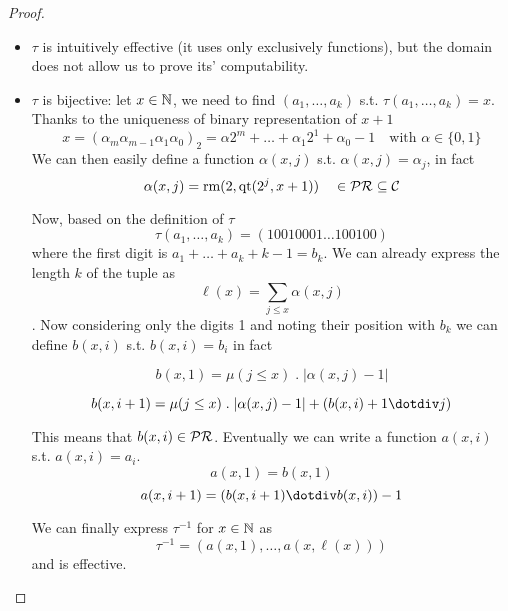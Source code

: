 \begin{lemma}
\begin{proof}
\begin{enumerate}[label=(\arabic*)]
{        \begin{itemize}
        \item $\tau$ is intuitively effective (it uses only
          exclusively functions), but the domain does not allow us to
          prove its' computability.
        \item $\tau$ is bijective: let $x \in \mathbb{N}$, we need to find
          $(a_1, \dots, a_k)$ s.t. $\tau(a_1,\dots,a_k) = x$. Thanks
          to the uniqueness of binary representation of $x+1$
          \[x = (\alpha_m \alpha_{m-1} \alpha_1 \alpha_0)_2 = \alpha
            2^m + \dots + \alpha_1 2^1 + \alpha_0 - 1 \quad \text{with
            } \alpha \in \{0,1\} \] We can then easily define a
          function $\alpha(x,j)$ s.t. $\alpha(x,j) = \alpha_j$, in
          fact
          \[\alpha(x, j) = \text{rm}(2, \text{qt}(2^j, x+1)) \quad \in
            \mathcal{PR} \subseteq \mathcal{C}\]

          Now, based on the definition of $\tau$
          \[\tau(a_1, \dots, a_k) = (1 0 0 1 0 0 0 1 \dots 1 0 0 1 0
            0)\] where the first digit is $a_1+\dots+a_k+k-1 =
          b_k$. We can already express the length $k$ of the tuple
          as \[\ell (x) = \sum_{j \leq x}\alpha(x,j)\]. Now considering
          only the digits 1 and noting their position with $b_k$ we
          can define $b(x,i)$ s.t. $b(x,i) = b_i$ in fact

          \[b(x,1) = \mu(j \leq x) \; . \; |\alpha(x,j) - 1|\]

          \[b(x,i+1) = \mu(j \leq x) \; . \; |\alpha(x,j)-1| +
            (b(x,i)+1 \dotdiv j)\]

          This means that $b(x,i)\in \mathcal{PR}$.  Eventually we can write a
          function $a(x,i)$ s.t. $a(x,i) = a_i$.
          \[a(x,1) = b(x,1)\]
          \[a(x,i+1) = (b(x,i+1) \dotdiv b(x,i))-1\]

          We can finally express $\tau^{-1}$ for $x \in \mathbb{N}$ as
          \[\tau^{-1} = (a(x,1), \dots, a(x, \ell(x)))\] and is
          effective.
        \end{itemize}
    \fi
    
    
       
      }
    \end{enumerate}
  \end{proof}
\end{lemma}

